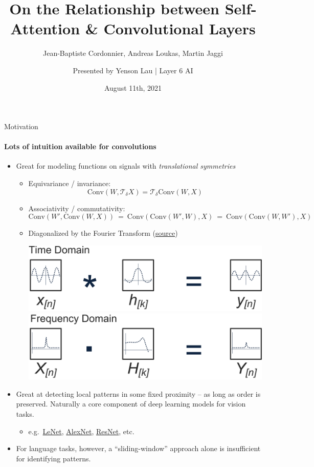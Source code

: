\documentclass[9pt]{beamer}
\title{On the Relationship between Self-Attention \& Convolutional Layers}
\subtitle{
    Jean-Baptiste Cordonnier, Andreas Loukas, Martin Jaggi
}
\author{
    Presented by Yenson Lau | Layer 6 AI
}
\date{August 11th, 2021}
\newcommand{\eq}{\ =\ }
\newcommand{\mc}{\mathcal}
\begin{document}
\maketitle


\begin{frame}{Motivation}
\framesubtitle{Lots of intuition available for convolutions}
\begin{itemize} \setlength\itemsep{1.2em}
\item Great for modeling functions on signals with {\em translational symmetries}

\begin{itemize} \setlength\itemsep{1em}
    \item Equivariance / invariance: 
    $$\textrm{Conv}(W, \mc T_{\delta} X) = \mc T_{\delta} \textrm{Conv}(W, X)$$
    
    \item Associativity / commutativity:
    \begin{equation*}
        \textrm{Conv}(W', \textrm{Conv}(W, X)) 
            \eq \textrm{Conv}(\textrm{Conv}(W', W), X)
            \eq \textrm{Conv}(\textrm{Conv}(W, W'), X) 
    \end{equation*}

    \item Diagonalized by the Fourier Transform
    (\href{http://hamiltonkibbe.com/finite-impulse-response-filters-using-apples-accelerate-framework-part-iii/}{source})
    \begin{center}
        \includegraphics[width=.4\textwidth]{presentation/images/conv-time.png}
        \qquad
        \includegraphics[width=.4\textwidth]{presentation/images/conv-freq.png}
    \end{center}
\end{itemize}

\item Great at detecting local patterns in some fixed proximity -- as long as order is preserved. Naturally a core component of deep learning models for vision tasks.
\begin{itemize}
    \item e.g.\ 
    \href{http://yann.lecun.com/exdb/lenet/}{LeNet}, 
    \href{https://papers.nips.cc/paper/2012/file/c399862d3b9d6b76c8436e924a68c45b-Paper.pdf}{AlexNet}, 
    \href{https://arxiv.org/abs/1512.03385}{ResNet}, etc.
\end{itemize}

\item For language tasks, however, a ``sliding-window'' approach alone is insufficient for identifying patterns.
\end{itemize}
\end{frame}
\end{document}
